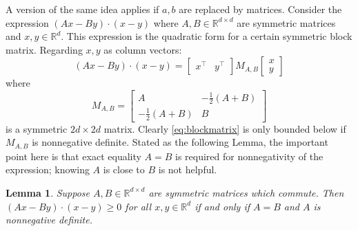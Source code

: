 \documentclass[letterpaper,final,12pt,reqno]{amsart}
\theoremstyle{cstyle}
\newtheorem{lemma}[theorem]{Lemma}
\theoremstyle{cstyle*}
\theoremstyle{dstyle}
\numberwithin{equation}{section}
\numberwithin{figure}{section}
\numberwithin{table}{section}
\numberwithin{theorem}{section}
\newcommand{\RR}{\mathbb{R}}
\begin{document}
A version of the same idea applies if $a,b$ are replaced by matrices.  Consider the expression $(Ax - By)\cdot (x-y)$ where $A,B \in \RR^{d\times d}$ are symmetric matrices and $x,y\in \RR^d$.  This expression is the quadratic form for a certain symmetric block matrix.  Regarding $x,y$ as column vectors:
\begin{equation}
(Ax - By)\cdot (x-y) = \begin{bmatrix} x^\top & y^\top \end{bmatrix} M_{A,B} \begin{bmatrix} x \\ y \end{bmatrix} \label{eq:blockmatrix}
\end{equation}
where
	$$M_{A,B} = \begin{bmatrix} A & -\frac{1}{2}(A+B) \\
                                -\frac{1}{2}(A+B) & B \end{bmatrix}$$
is a symmetric $2d \times 2d$ matrix.  Clearly \eqref{eq:blockmatrix} is only bounded below if $M_{A,B}$ is nonnegative definite.  Stated as the following Lemma, the important point here is that exact equality $A=B$ is required for nonnegativity of the expression; knowing $A$ is close to $B$ is not helpful.

\begin{lemma}  Suppose $A,B \in \RR^{d\times d}$ are symmetric matrices which commute.  Then $(Ax - By)\cdot (x-y)\ge 0$ for all $x,y\in \RR^d$ if and only if $A=B$ and $A$ is nonnegative definite. \end{lemma}

\newcommand{\sbvec}[2]{\left[\begin{smallmatrix} #1 \\ #2 \end{smallmatrix}\right]}
\newcommand{\sbmat}[4]{\left[\begin{matrix} #1 & #2 \\ #3 & #4 \end{matrix}\right]}
\end{document}
